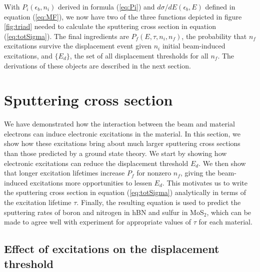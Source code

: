 \documentclass{article}
\begin{document}
With $P_i(\epsilon_b, n_i)$ derived in formula (\ref{eq:Pi}) and
$d\sigma/dE(\epsilon_b, E)$ defined in equation (\ref{eq:MF}), we now have two
of the three functions depicted in figure \ref{fig:triad} needed to calculate
the sputtering cross section in equation (\ref{eq:totSigma}).
The final ingredients are $P_f(E, \tau, n_i, n_f)$, the probability that $n_f$
excitations survive the displacement event given $n_i$ initial beam-induced
excitations, and $\{E_d\}$, the set of all displacement thresholds for all
$n_f$.
The derivations of these objects are described in the next section.

\section{Sputtering cross section}
\label{sec:sputtering}

We have demonstrated how the interaction between the beam and material
electrons can induce electronic excitations in the material.
In this section, we show how these excitations bring about much larger
sputtering cross sections than those predicted by a ground state theory.
We start by showing how electronic excitations can reduce the displacement
threshold $E_d$.
We then show that longer excitation lifetimes increase $P_f$ for nonzero $n_f$,
giving the beam-induced excitations more opportunities to lessen $E_d$.
This motivates us to write the sputtering cross section in equation
(\ref{eq:totSigma}) analytically in terms of the excitation lifetime $\tau$.
Finally, the resulting equation is used to predict the sputtering rates of
boron and nitrogen in hBN and sulfur in MoS$_2$, which can be made to agree
well with experiment for appropriate values of $\tau$ for each material.

\subsection{Effect of excitations on the displacement threshold}
\label{sec:assumptions}
\end{document}

